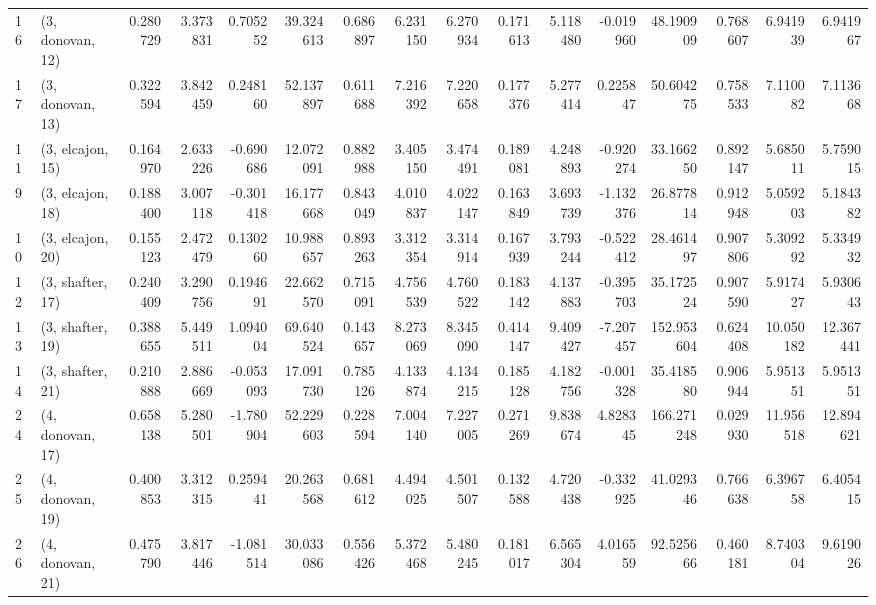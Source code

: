 \begin{tabular}{llrrrrrrrrrrrrrr}
16 &  (3, donovan, 12) &   0.280729 &  3.373831 &  0.705252 &  39.324613 &  0.686897 &   6.231150 &  6.270934 &  0.171613 &   5.118480 & -0.019960 &   48.190909 &  0.768607 &   6.941939 &   6.941967 \\
17 &  (3, donovan, 13) &   0.322594 &  3.842459 &  0.248160 &  52.137897 &  0.611688 &   7.216392 &  7.220658 &  0.177376 &   5.277414 &  0.225847 &   50.604275 &  0.758533 &   7.110082 &   7.113668 \\
11 &  (3, elcajon, 15) &   0.164970 &  2.633226 & -0.690686 &  12.072091 &  0.882988 &   3.405150 &  3.474491 &  0.189081 &   4.248893 & -0.920274 &   33.166250 &  0.892147 &   5.685011 &   5.759015 \\
9  &  (3, elcajon, 18) &   0.188400 &  3.007118 & -0.301418 &  16.177668 &  0.843049 &   4.010837 &  4.022147 &  0.163849 &   3.693739 & -1.132376 &   26.877814 &  0.912948 &   5.059203 &   5.184382 \\
10 &  (3, elcajon, 20) &   0.155123 &  2.472479 &  0.130260 &  10.988657 &  0.893263 &   3.312354 &  3.314914 &  0.167939 &   3.793244 & -0.522412 &   28.461497 &  0.907806 &   5.309292 &   5.334932 \\
12 &  (3, shafter, 17) &   0.240409 &  3.290756 &  0.194691 &  22.662570 &  0.715091 &   4.756539 &  4.760522 &  0.183142 &   4.137883 & -0.395703 &   35.172524 &  0.907590 &   5.917427 &   5.930643 \\
13 &  (3, shafter, 19) &   0.388655 &  5.449511 &  1.094004 &  69.640524 &  0.143657 &   8.273069 &  8.345090 &  0.414147 &   9.409427 & -7.207457 &  152.953604 &  0.624408 &  10.050182 &  12.367441 \\
14 &  (3, shafter, 21) &   0.210888 &  2.886669 & -0.053093 &  17.091730 &  0.785126 &   4.133874 &  4.134215 &  0.185128 &   4.182756 & -0.001328 &   35.418580 &  0.906944 &   5.951351 &   5.951351 \\
24 &  (4, donovan, 17) &   0.658138 &  5.280501 & -1.780904 &  52.229603 &  0.228594 &   7.004140 &  7.227005 &  0.271269 &   9.838674 &  4.828345 &  166.271248 &  0.029930 &  11.956518 &  12.894621 \\
25 &  (4, donovan, 19) &   0.400853 &  3.312315 &  0.259441 &  20.263568 &  0.681612 &   4.494025 &  4.501507 &  0.132588 &   4.720438 & -0.332925 &   41.029346 &  0.766638 &   6.396758 &   6.405415 \\
26 &  (4, donovan, 21) &   0.475790 &  3.817446 & -1.081514 &  30.033086 &  0.556426 &   5.372468 &  5.480245 &  0.181017 &   6.565304 &  4.016559 &   92.525666 &  0.460181 &   8.740304 &   9.619026 \\

\end{tabular}
